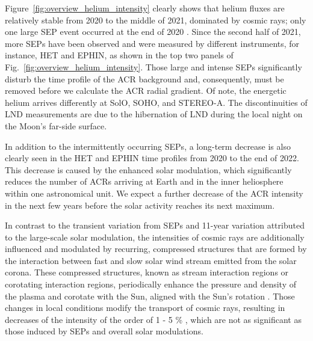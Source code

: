Figure~\ref{fig:overview_helium_intensity} clearly shows that helium fluxes are relatively stable from 2020 to the middle of 2021, dominated by cosmic rays; only one large \ac{SEP} event occurred at the end of 2020 \citep{Kolhoff2021AA}. 
Since the second half of 2021, more \acp{SEP} have been observed and were measured by different instruments, for instance, \ac{HET} and \ac{EPHIN}, as shown in the top two panels of Fig.~\ref{fig:overview_helium_intensity}.
Those large and intense \acp{SEP} significantly disturb the time profile of the \ac{ACR} background and, consequently, must be removed before we calculate the \ac{ACR} radial gradient. 
Of note, the energetic helium arrives differently at \ac{SolO}, \ac{SOHO}, and \ac{STEREO}-A. The discontinuities of \ac{LND} measurements are due to the hibernation of \ac{LND} during the local night on the Moon's far-side surface.


In addition to the intermittently occurring \acp{SEP}, a long-term decrease is also clearly seen in the \ac{HET} and \ac{EPHIN} time profiles from 2020 to the end of 2022. This decrease is caused by the enhanced solar modulation, which significantly reduces the number of \acp{ACR} arriving at Earth and in the inner heliosphere within one astronomical unit. We expect a further decrease of the \ac{ACR} intensity in the next few years before the solar activity reaches its next maximum.

In contrast to the transient variation from \acp{SEP} and 11-year variation attributed to the large-scale solar modulation, the intensities of cosmic rays are additionally influenced and modulated by recurring, compressed structures that are formed by the interaction between fast and slow solar wind stream emitted from the solar corona. These compressed structures, known as stream interaction regions or corotating interaction regions, periodically enhance the pressure and density of the plasma and corotate with the Sun, aligned with the Sun's rotation \citep{Burlaga1974JGR, Gosling1976JGR, Richardson2004SSRv}. Those changes in local conditions modify the transport of cosmic rays, resulting in decreases of the intensity of the order of 1 - 5 \% \citep{Richardson2004SSRv, Richardson-2018}, which are not as significant as those induced by \acp{SEP} and overall solar modulations.

